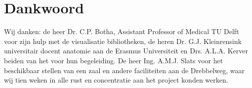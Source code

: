 \chapter{Dankwoord}
\label{Dankwoord}
Wij danken: de heer Dr. C.P. Botha, Assistant Professor of Medical TU Delft voor zijn hulp met de visualisatie bibliotheken, de heren Dr. G.J. Kleinrensink universitair docent anatomie aan de Erasmus Universiteit en Drs. A.L.A. Kerver beiden van het \casamproject voor hun begeleiding. De heer Ing. A.M.J. Slats voor het beschikbaar stellen van een zaal en andere faciliteiten aan de Drebbelweg, waar wij tien weken in alle rust en concentratie aan het project konden werken.

